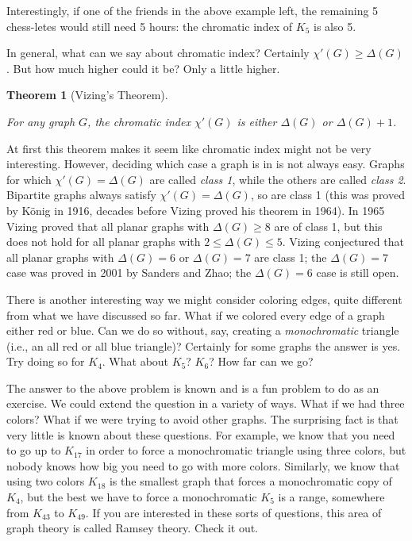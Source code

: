 \documentclass[10pt,]{book}
\theoremstyle{plain}
\newtheorem{theorem}{Theorem}[section]
\theoremstyle{definition}
\theoremstyle{definition}
\theoremstyle{definition}
\numberwithin{equation}{chapter}
\begin{document}
Interestingly, if one of the friends in the above example left, the remaining 5 chess-letes would still need 5 hours: the chromatic index of \(K_5\) is also 5.
%
\par

In general, what can we say about chromatic index? Certainly \(\chi'(G) \ge \Delta(G)\). But how much higher could it be? Only a little higher.
%
\begin{theorem}[Vizing's Theorem]\label{theorem-8}

For any graph \(G\), the chromatic index \(\chi'(G)\) is either \(\Delta(G)\) or \(\Delta(G) + 1\).
%
\end{theorem}
\par

At first this theorem makes it seem like chromatic index might not be very interesting. However, deciding which case a graph is in is not always easy. Graphs for which \(\chi'(G) = \Delta(G)\) are called \emph{class 1}, while the others are called \emph{class 2}. Bipartite graphs always satisfy \(\chi'(G) = \Delta(G)\), so are class 1 (this was proved by König in 1916, decades before Vizing proved his theorem in 1964). In 1965 Vizing proved that all planar graphs with \(\Delta(G) \ge 8\) are of class 1, but this does not hold for all planar graphs with \(2 \le \Delta(G) \le 5\). Vizing conjectured that all planar graphs with \(\Delta(G) = 6\) or \(\Delta(G) = 7\) are class 1; the \(\Delta(G) = 7\) case was proved in 2001 by Sanders and Zhao; the \(\Delta(G) = 6\) case is still open.
%
\par

There is another interesting way we might consider coloring edges, quite different from what we have discussed so far. What if we colored every edge of a graph either red or blue. Can we do so without, say, creating a \emph{monochromatic} triangle (i.e., an all red or all blue triangle)? Certainly for some graphs the answer is yes. Try doing so for \(K_4\). What about \(K_5\)? \(K_6\)? How far can we go?
%
\par

The answer to the above problem is known and is a fun problem to do as an exercise. We could extend the question in a variety of ways. What if we had three colors? What if we were trying to avoid other graphs. The surprising fact is that very little is known about these questions. For example, we know that you need to go up to \(K_{17}\) in order to force a monochromatic triangle using three colors, but nobody knows how big you need to go with more colors. Similarly, we know that using two colors \(K_{18}\) is the smallest graph that forces a monochromatic copy of \(K_4\), but the best we have to force a monochromatic \(K_{5}\) is a range, somewhere from \(K_{43}\) to \(K_{49}\). If you are interested in these sorts of questions, this area of graph theory is called Ramsey theory. Check it out.
%
\typeout{************************************************}
\typeout{************************************************}
\end{document}
